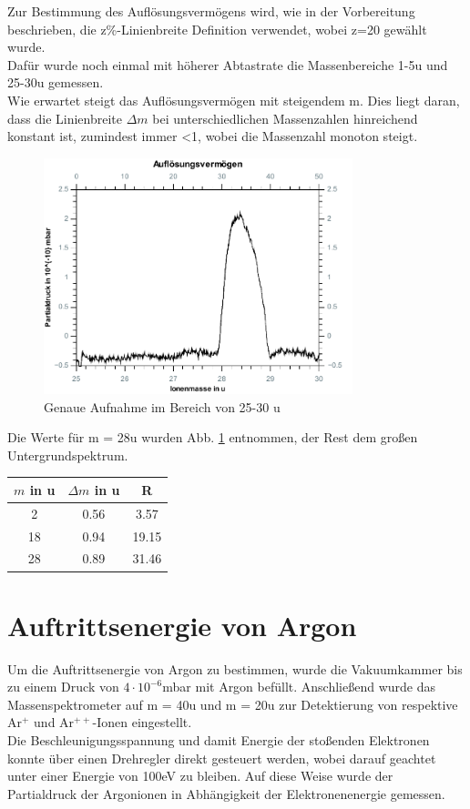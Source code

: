 Zur Bestimmung des Auflösungsvermögens wird, wie in der Vorbereitung beschrieben, die z\%-Linienbreite Definition verwendet, wobei z=20 gewählt wurde.\\
Dafür wurde noch einmal mit höherer Abtastrate die Massenbereiche 1-5\;u und 25-30\;u gemessen.\\
Wie erwartet steigt das Auflösungsvermögen mit steigendem m. Dies liegt daran, dass die Linienbreite $\Delta m$ bei unterschiedlichen Massenzahlen hinreichend konstant ist, zumindest immer <1, wobei die Massenzahl monoton steigt.\\
\begin{figure}[h]
	\centering\includegraphics[width=0.8\textwidth]{fig/aufloesung}
	\caption{Genaue Aufnahme im Bereich von 25-30 u}
	\label{fig:aufloesung}
\end{figure}
Die Werte für m = 28\;u wurden Abb. \ref{fig:aufloesung} entnommen, der Rest dem großen Untergrundspektrum.
\begin{tabular}{ccc}
	\toprule
	$m$ in u&$\Delta m$ in u&R\\
	\midrule
	2&0.56&3.57\\
	18&0.94&19.15\\
	28&0.89&31.46\\
	\bottomrule
\end{tabular}

\section{Auftrittsenergie von Argon}
\label{sec:argon}

Um die Auftrittsenergie von Argon zu bestimmen, wurde die Vakuumkammer bis zu einem Druck von $4\cdot 10^{-6}$\;mbar mit Argon befüllt.
Anschließend wurde das Massenspektrometer auf m = 40\;u und m = 20\;u zur Detektierung von respektive Ar$^{+}$ und Ar$^{++}$-Ionen eingestellt.\\
Die Beschleunigungsspannung und damit Energie der stoßenden Elektronen konnte über einen Drehregler direkt gesteuert werden, wobei darauf geachtet unter einer Energie von 100\;eV zu bleiben.
Auf diese Weise wurde der Partialdruck der Argonionen in Abhängigkeit der Elektronenenergie gemessen.

